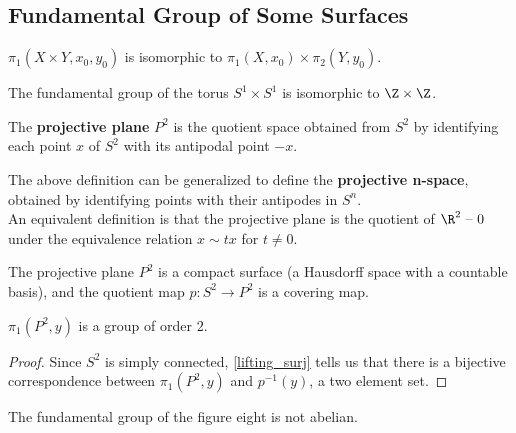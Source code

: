 \subsection{Fundamental Group of Some Surfaces}

\begin{theorem}
$\pi_1(X \times Y, x_0, y_0)$ is isomorphic to $\pi_1(X, x_0) \times \pi_2(Y, y_0)$. 
\end{theorem}

\begin{corollary}
The fundamental group of the torus $S^1 \times S^1$ is isomorphic to $\Z \times \Z$.
\end{corollary}

\begin{definition}
The \textbf{projective plane} $P^2$ is the quotient space obtained from $S^2$ by identifying each point $x$ of $S^2$ with its antipodal point $-x$.
\end{definition}

\begin{remark}
The above definition can be generalized to define the \textbf{projective n-space}, obtained by identifying points with their antipodes in $S^n$. \\

An equivalent definition is that the projective plane is the quotient of $\R^2 \text{ -- } 0$ under the equivalence relation $x \sim tx$ for $t \neq 0$. \\
\end{remark}

\begin{theorem}
The projective plane $P^2$ is a compact surface (a Hausdorff space with a countable basis), and the quotient map $p\colon S^2 \rightarrow P^2$ is a covering map.
\end{theorem}

\begin{corollary}
$\pi_1(P^2, y)$ is a group of order $2$.
\end{corollary}

\begin{proof}
Since $S^2$ is simply connected, \cref{lifting_surj} tells us that there is a bijective correspondence between $\pi_1(P^2, y)$ and $p^{-1}(y)$, a two element set.
\end{proof}

\begin{lemma}
The fundamental group of the figure eight is not abelian. 
\end{lemma}

